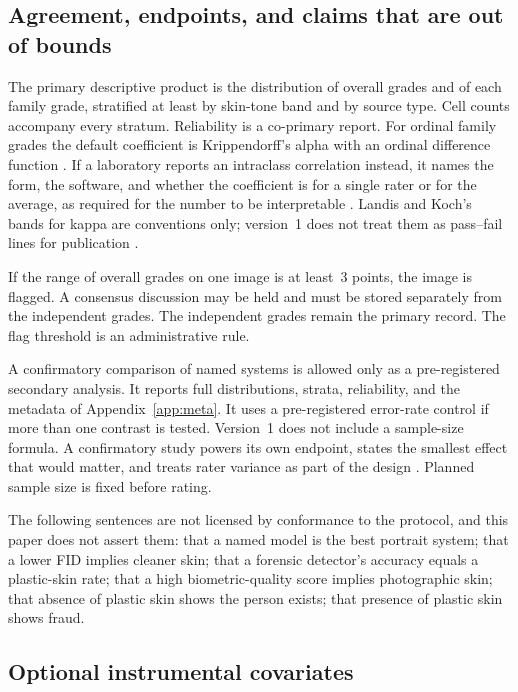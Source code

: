 \documentclass[10pt,twocolumn]{article}
\begin{document}
\subsection{Agreement, endpoints, and claims that are out of bounds}

The primary descriptive product is the distribution of overall grades and of each family grade, stratified at least by skin-tone band and by source type. Cell counts accompany every stratum. Reliability is a co-primary report. For ordinal family grades the default coefficient is Krippendorff's alpha with an ordinal difference function \cite{hayes2007}. If a laboratory reports an intraclass correlation instead, it names the form, the software, and whether the coefficient is for a single rater or for the average, as required for the number to be interpretable \cite{shrout1979,koo2016}. Landis and Koch's bands for kappa are conventions only; version~1 does not treat them as pass--fail lines for publication \cite{landis1977,cohen1960}.

If the range of overall grades on one image is at least~3 points, the image is flagged. A consensus discussion may be held and must be stored separately from the independent grades. The independent grades remain the primary record. The flag threshold is an administrative rule.

A confirmatory comparison of named systems is allowed only as a pre-registered secondary analysis. It reports full distributions, strata, reliability, and the metadata of Appendix~\ref{app:meta}. It uses a pre-registered error-rate control if more than one contrast is tested. Version~1 does not include a sample-size formula. A confirmatory study powers its own endpoint, states the smallest effect that would matter, and treats rater variance as part of the design \cite{hallgren2012}. Planned sample size is fixed before rating.

The following sentences are not licensed by conformance to the protocol, and this paper does not assert them: that a named model is the best portrait system; that a lower FID implies cleaner skin; that a forensic detector's accuracy equals a plastic-skin rate; that a high biometric-quality score implies photographic skin; that absence of plastic skin shows the person exists; that presence of plastic skin shows fraud.

\subsection{Optional instrumental covariates}
\label{sec:instrument}
\end{document}
